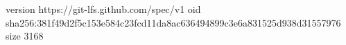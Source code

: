 version https://git-lfs.github.com/spec/v1
oid sha256:381f49d2f5c153e584c23fcd11da8ac636494899c3e6a831525d938d31557976
size 3168
